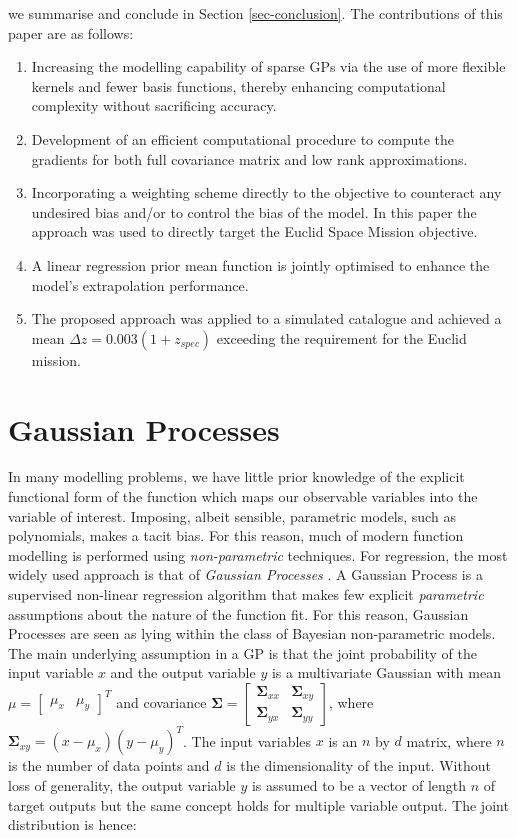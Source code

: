 \documentclass[useAMS,usenatbib,fleqn]{mn2e}
\begin{document}
we summarise and conclude in Section \ref{sec-conclusion}. The contributions of this paper are as follows:
\begin{enumerate}
  \item Increasing the modelling capability of sparse GPs via the use of more flexible kernels and fewer basis functions, thereby enhancing computational complexity without sacrificing accuracy.
  \item Development of an efficient computational procedure to compute the gradients for both full covariance matrix and low rank approximations.
  \item Incorporating a weighting scheme directly to the objective to counteract any undesired bias and/or to control the bias of the model. In this paper the approach was used to directly target the Euclid Space Mission objective.
  \item A linear regression prior mean function is jointly optimised to enhance the model's extrapolation performance.
  \item The proposed approach was applied to a simulated catalogue and achieved  a mean $\Delta z = 0.003(1+z_{spec})$ exceeding the requirement for the Euclid mission.
\end{enumerate}

\section{Gaussian Processes}
\label{sec-gaussian-process}
In many modelling problems, we have little prior knowledge of the explicit functional form of the function which maps our observable variables into the variable of interest. Imposing, albeit sensible, parametric models, such as polynomials, makes a tacit bias. For this reason, much of modern function modelling is performed using \emph{non-parametric} techniques. For regression, the most widely used approach is that of \emph{Gaussian Processes} \citep{rasmussen2006gaussian}.
A Gaussian Process is a supervised non-linear regression algorithm that makes few explicit \emph{parametric} assumptions about the nature of the function fit. For this reason, Gaussian Processes are seen as lying within the class of Bayesian non-parametric models. The main underlying assumption in a GP is that the joint probability of the input variable $x$ and the output variable $y$ is a multivariate Gaussian with mean $\mu=\begin{bmatrix} \mu_{x} & \mu_{y}\end{bmatrix}^{T}$ and covariance $\mathbf\Sigma=\begin{bmatrix}\mathbf\Sigma_{xx} & \mathbf\Sigma_{xy} \\ \mathbf\Sigma_{yx} & \mathbf\Sigma_{yy} \end{bmatrix}$, where $\mathbf\Sigma_{xy}=(x-\mu_{x})(y-\mu_{y})^{T}$. The input variables $x$ is an $n$ by $d$ matrix, where $n$ is the number of data points and $d$ is the dimensionality of the input. Without loss of generality, the output variable $y$ is assumed to be a vector of length $n$ of target outputs but the same concept holds for multiple variable output. The joint distribution is hence:
\end{document}
